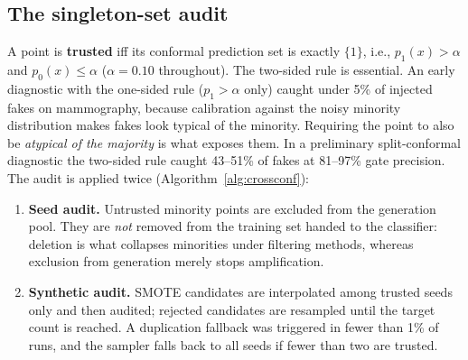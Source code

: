 \documentclass[10pt]{article} %
\begin{document}
\subsection{The singleton-set audit}

A point is \textbf{trusted} iff its conformal prediction set is exactly $\{1\}$, i.e., $p_1(x) > \alpha$ and $p_0(x) \le \alpha$ ($\alpha = 0.10$ throughout). The two-sided rule is essential. An early diagnostic with the one-sided rule ($p_1 > \alpha$ only) caught under 5\% of injected fakes on mammography, because calibration against the noisy minority distribution makes fakes look typical of the minority. Requiring the point to also be \emph{atypical of the majority} is what exposes them. In a preliminary split-conformal diagnostic the two-sided rule caught 43--51\% of fakes at 81--97\% gate precision. The audit is applied twice (Algorithm~\ref{alg:crossconf}):
\begin{enumerate}
\item \textbf{Seed audit.} Untrusted minority points are excluded from the generation pool. They are \emph{not} removed from the training set handed to the classifier: deletion is what collapses minorities under filtering methods, whereas exclusion from generation merely stops amplification.
\item \textbf{Synthetic audit.} SMOTE candidates are interpolated among trusted seeds only and then audited; rejected candidates are resampled until the target count is reached. A duplication fallback was triggered in fewer than 1\% of runs, and the sampler falls back to all seeds if fewer than two are trusted.
\end{enumerate}

\begin{center}
\label{alg:crossconf}
\end{center}
\end{document}
